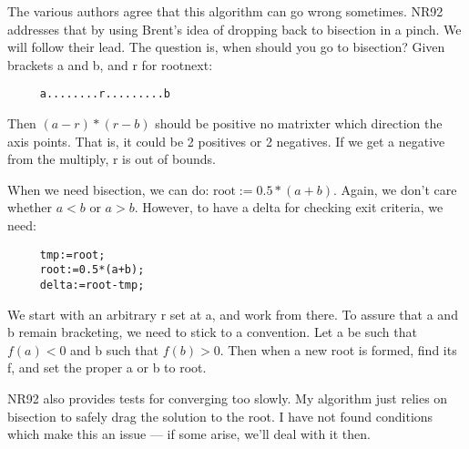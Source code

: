 The various authors agree that this algorithm can go wrong
sometimes.  NR92 addresses that by using Brent's idea of
dropping back to bisection in a pinch.  We will follow their
lead.  The question is, when should you go to bisection?
Given brackets a and b, and r for rootnext:
\begin{verbatim}
     a........r.........b
\end{verbatim}

Then $(a-r)*(r-b)$ should be positive no matrixter which
direction the axis points.  That is, it could be 2 positives
or 2 negatives.  If we get a negative from the multiply, r
is out of bounds.

When we need bisection, we can do: $\mbox{root}:=0.5*(a+b)$.
Again, we don't care whether $a<b$ or $a>b$.  However, to have a
delta for checking exit criteria, we need:
\begin{verbatim}
     tmp:=root;
     root:=0.5*(a+b);
     delta:=root-tmp;
\end{verbatim}

We start with an arbitrary r set at a, and work from there.
To assure that a and b remain bracketing, we need to stick
to a convention.  Let a be such that $f(a)<0$ and b such that
$f(b)>0$.  Then when a new root is formed, find its f, and set
the proper a or b to root.

NR92 also provides tests for converging too slowly.  My
algorithm just relies on bisection to safely drag the
solution to the root.  I have not found conditions which
make this an issue --- if some arise, we'll deal with it
then.
